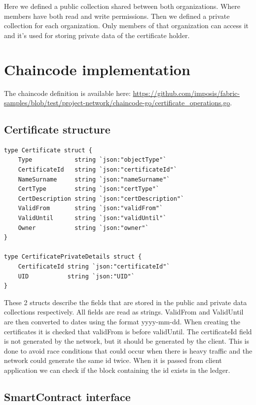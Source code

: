 \documentclass[12pt]{article}
\begin{document}
Here we defined a public collection shared between both organizations. Where members have both read and write permissions.
Then we defined a private collection for each organization. Only members of that organization can access it and it's used for storing private data of the certificate holder.

\newpage

\section{Chaincode implementation}
The chaincode definition is available here: \url{https://github.com/imposis/fabric-samples/blob/test/project-network/chaincode-go/certificate_operations.go}.

\subsection{Certificate structure}

\begin{lstlisting}[language=Golang]
type Certificate struct {
	Type            string `json:"objectType"`
	CertificateId   string `json:"certificateId"`
	NameSurname     string `json:"nameSurname"`
	CertType        string `json:"certType"`
	CertDescription string `json:"certDescription"`
	ValidFrom       string `json:"validFrom"`
	ValidUntil      string `json:"validUntil"`
	Owner           string `json:"owner"`
}

type CertificatePrivateDetails struct {
	CertificateId string `json:"certificateId"`
	UID           string `json:"UID"`
}
\end{lstlisting}

These 2 structs describe the fields that are stored in the public and private data collections respectively. All fields are read as strings.
ValidFrom and ValidUntil are then converted to dates using the format yyyy-mm-dd.
When creating the certificates it is checked that validFrom is before validUntil.
The certificateId field is not generated by the network, but it should be generated by the client.
This is done to avoid race conditions that could occur when there is heavy traffic and the network could generate the same id twice.
When it is passed from client application we can check if the block containing the id exists in the ledger.

\subsection{SmartContract interface}
\end{document}
